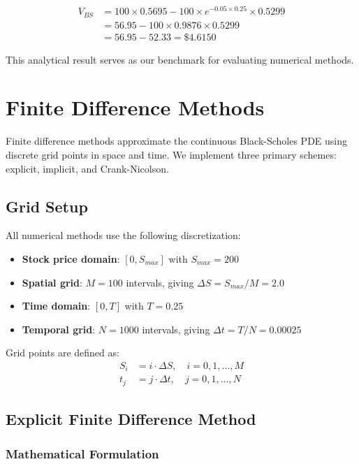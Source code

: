 \documentclass[12pt,a4paper]{article}
\numberwithin{algorithm}{subsection}
\begin{document}
\begin{align}
V_{BS} &= 100 \times 0.5695 - 100 \times e^{-0.05 \times 0.25} \times 0.5299 \\
       &= 56.95 - 100 \times 0.9876 \times 0.5299 \\
       &= 56.95 - 52.33 = \$4.6150
\end{align}

This analytical result serves as our benchmark for evaluating numerical methods.

\section{Finite Difference Methods}
\label{sec:fdm-methods}

Finite difference methods approximate the continuous Black-Scholes PDE using discrete grid points in space and time. We implement three primary schemes: explicit, implicit, and Crank-Nicolson.

\subsection{Grid Setup}

All numerical methods use the following discretization:

\begin{itemize}
\item \textbf{Stock price domain}: $[0, S_{max}]$ with $S_{max} = 200$
\item \textbf{Spatial grid}: $M = 100$ intervals, giving $\Delta S = S_{max}/M = 2.0$
\item \textbf{Time domain}: $[0, T]$ with $T = 0.25$
\item \textbf{Temporal grid}: $N = 1000$ intervals, giving $\Delta t = T/N = 0.00025$
\end{itemize}

Grid points are defined as:
\begin{align}
S_i &= i \cdot \Delta S, \quad i = 0, 1, \ldots, M \\
t_j &= j \cdot \Delta t, \quad j = 0, 1, \ldots, N
\end{align}

\subsection{Explicit Finite Difference Method}

\subsubsection{Mathematical Formulation}
\end{document}
